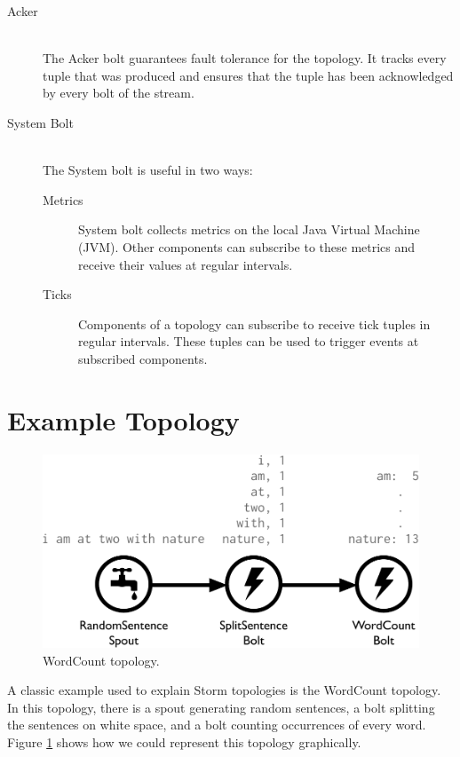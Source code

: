 \documentclass[bsc,deptreport,twoside,singlespacing,normalheadings,parskip]{infthesis}\usepackage[]{graphicx}\usepackage[]{color}
\begin{document}
\begin{description}
	\item[Acker] \hfill \\
	The Acker bolt guarantees fault tolerance for the topology. It tracks every tuple that was produced and ensures that the tuple has been acknowledged by every bolt of the stream.
	\item[System Bolt] \hfill \\
	The System bolt is useful in two ways:
	\begin{description}
		\item[Metrics] System bolt collects metrics on the local Java Virtual Machine (JVM). Other components can subscribe to these metrics and receive their values at  regular intervals.
		\item[Ticks] Components of a topology can subscribe to receive tick tuples in regular intervals. These tuples can be used to trigger events at subscribed components.
	\end{description}
\end{description}

\section{Example Topology}
\label{sec:example_topology}

\begin{figure}[!htb]
	\centering
	\includegraphics[scale=0.475]{pdf/wordcount_topology.pdf}
	\caption{WordCount topology.}
	\label{fig:wordcount_topology}
\end{figure}

A classic example used to explain Storm topologies is the WordCount topology. In this topology, there is a spout generating random sentences, a bolt splitting the sentences on white space, and a bolt counting occurrences of every word. Figure \ref{fig:wordcount_topology} shows how we could represent this topology graphically.
\end{document}
